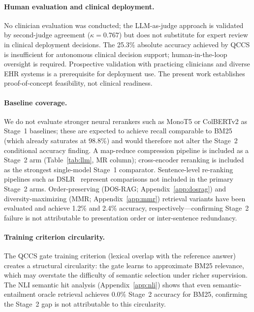 \documentclass{article}
\begin{document}
\paragraph{Human evaluation and clinical deployment.}
No clinician evaluation was conducted; the LLM-as-judge approach is validated by
second-judge agreement ($\kappa = 0.767$) but does not substitute for expert review
in clinical deployment decisions. The 25.3\% absolute accuracy achieved by QCCS is
insufficient for autonomous clinical decision support; human-in-the-loop oversight
is required. Prospective validation with practicing clinicians and diverse EHR
systems is a prerequisite for deployment use. The present work establishes
proof-of-concept feasibility, not clinical readiness.

\paragraph{Baseline coverage.}
We do not evaluate stronger neural rerankers such as MonoT5 or ColBERTv2 as Stage~1
baselines; these are expected to achieve recall comparable to BM25 (which already
saturates at 98.8\%) and would therefore not alter the Stage~2 conditional accuracy
finding. A map-reduce compression pipeline is included as a Stage~2 arm
(Table~\ref{tab:llm}, MR column); cross-encoder reranking is included as the
strongest single-model Stage~1 comparator.
Sentence-level re-ranking pipelines such as DSLR~\cite{xu2024dslr} represent
comparisons not included in the primary Stage~2 arms.
Order-preserving (DOS-RAG; Appendix~\ref{app:dosrag}) and diversity-maximizing
(MMR; Appendix~\ref{app:mmr}) retrieval variants have been evaluated and achieve
1.2\% and 2.4\% accuracy, respectively---confirming Stage~2 failure is not
attributable to presentation order or inter-sentence redundancy.

\paragraph{Training criterion circularity.}
The QCCS gate training criterion (lexical overlap with the reference answer) creates
a structural circularity: the gate learns to approximate BM25 relevance, which may
overstate the difficulty of semantic selection under richer supervision. The NLI
semantic hit analysis (Appendix~\ref{app:nli}) shows that even semantic-entailment
oracle retrieval achieves 0.0\% Stage~2 accuracy for BM25, confirming the Stage~2
gap is not attributable to this circularity.
\end{document}
